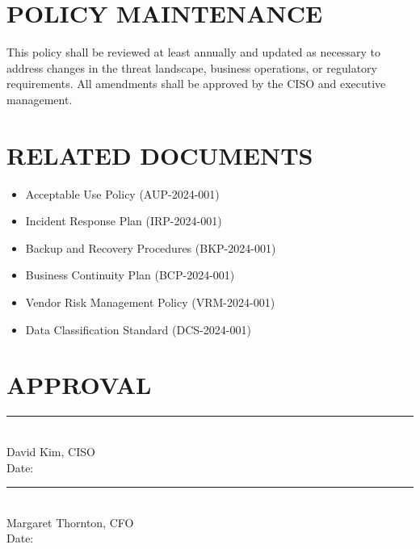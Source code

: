 \documentclass[
    language=english,
    doctype=policy-document,
    institution=none,
]{../../omnilatex}
\begin{document}
\section{POLICY MAINTENANCE}

This policy shall be reviewed at least annually and updated as necessary to address changes in the threat landscape, business operations, or regulatory requirements. All amendments shall be approved by the CISO and executive management.

\section{RELATED DOCUMENTS}

\begin{itemize}
    \item Acceptable Use Policy (AUP-2024-001)
    \item Incident Response Plan (IRP-2024-001)
    \item Backup and Recovery Procedures (BKP-2024-001)
    \item Business Continuity Plan (BCP-2024-001)
    \item Vendor Risk Management Policy (VRM-2024-001)
    \item Data Classification Standard (DCS-2024-001)
\end{itemize}

\section{APPROVAL}

\vspace{1cm}

\noindent\rule{5cm}{0.4pt}\\
David Kim, CISO\\
Date: \underline{\hspace{3cm}}

\vspace{1cm}

\noindent\rule{5cm}{0.4pt}\\
Margaret Thornton, CFO\\
Date: \underline{\hspace{3cm}}
\end{document}
